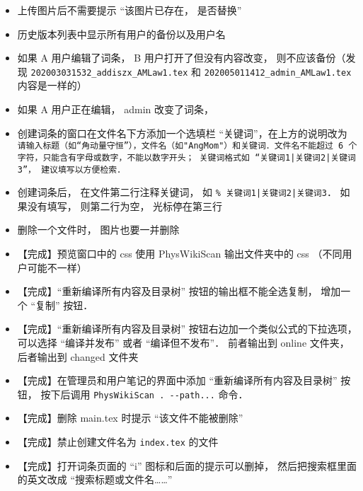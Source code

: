 \begin{itemize}
\item 上传图片后不需要提示 “该图片已存在， 是否替换”

\item 历史版本列表中显示所有用户的备份以及用户名

\item 如果 A 用户编辑了词条， B 用户打开了但没有内容改变， 则不应该备份（发现 \verb|202003031532_addiszx_AMLaw1.tex| 和 \verb|202005011412_admin_AMLaw1.tex| 内容是一样的）

\item 如果 A 用户正在编辑， admin 改变了词条， 

\item 创建词条的窗口在文件名下方添加一个选填栏 “关键词”，在上方的说明改为 \lstinline+请输入标题（如“角动量守恒”），文件名（如"AngMom"）和关键词．文件名不能超过 6 个字符，只能含有字母或数字，不能以数字开头； 关键词格式如 “关键词1|关键词2|关键词3”， 建议填写以方便检索．+

\item 创建词条后， 在文件第二行注释关键词， 如 \lstinline+% 关键词1|关键词2|关键词3+． 如果没有填写， 则第二行为空， 光标停在第三行

\item 删除一个文件时， 图片也要一并删除

\item 【完成】预览窗口中的 css 使用 PhysWikiScan 输出文件夹中的 css （不同用户可能不一样）

\item 【完成】“重新编译所有内容及目录树” 按钮的输出框不能全选复制， 增加一个 “复制” 按钮．

\item 【完成】“重新编译所有内容及目录树” 按钮右边加一个类似公式的下拉选项， 可以选择 “编译并发布” 或者 “编译但不发布”． 前者输出到 online 文件夹， 后者输出到 changed 文件夹

\item 【完成】在管理员和用户笔记的界面中添加 “重新编译所有内容及目录树” 按钮， 按下后调用 \lstinline|PhysWikiScan . --path...|  命令．

\item 【完成】删除 main.tex 时提示 “该文件不能被删除”

\item 【完成】禁止创建文件名为 \lstinline|index.tex| 的文件

\item 【完成】打开词条页面的 “i” 图标和后面的提示可以删掉， 然后把搜索框里面的英文改成 “搜索标题或文件名……”


\end{itemize}
